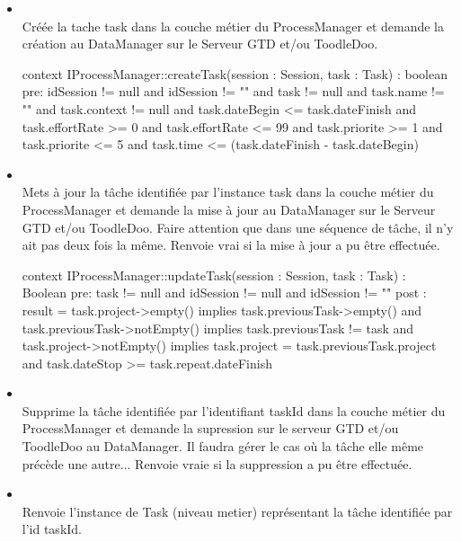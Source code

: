 	
	\begin{itemize}
		\item {} \\
		Créée la tache task dans la couche métier du ProcessManager et demande la
		création au DataManager sur le Serveur GTD et/ou ToodleDoo.
\begin{ocl}
context IProcessManager::createTask(session : Session, task : Task) : boolean
pre: 
	idSession != null and idSession != "" and
	task != null and
	task.name != "" and
	task.context != null and
	task.dateBegin <= task.dateFinish and
	task.effortRate >= 0 and
	task.effortRate <= 99 and
	task.priorite >= 1 and
	task.priorite <= 5 and
	task.time <= (task.dateFinish - task.dateBegin)		
\end{ocl}

		\item {} \\
		Mets à jour la tâche identifiée par l'instance task dans la couche métier du
		ProcessManager et demande la mise à jour au DataManager sur le Serveur GTD
		et/ou ToodleDoo. Faire attention que dans une séquence de tâche, il n'y ait pas deux fois la même. Renvoie vrai si la mise à jour a pu être effectuée.
\begin{ocl}
context IProcessManager::updateTask(session : Session, task : Task) : Boolean
pre: 
	task != null and idSession != null and idSession != ""
post :
	result = task.project->empty() implies task.previousTask->empty() and
	task.previousTask->notEmpty() implies task.previousTask != task and
	task.project->notEmpty() implies task.project = task.previousTask.project and
	task.dateStop >= task.repeat.dateFinish	
\end{ocl}
		
		\item {} \\
		Supprime la tâche identifiée par l'identifiant taskId dans la couche métier
		du ProcessManager et demande la supression sur le serveur GTD et/ou ToodleDoo
		au DataManager.
		Il faudra gérer le cas où la tâche elle même précède une autre... Renvoie vraie si la suppression a pu être effectuée.
		
		\item {} \\
		Renvoie l'instance de Task (niveau metier) représentant la tâche identifiée
		par l'id taskId.
		

\end{itemize}
